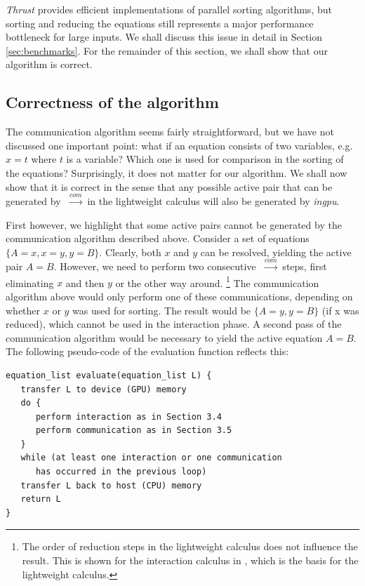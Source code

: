\documentclass[submission,copyright,creativecommons]{eptcs}
\newcommand{\lwcom}{$\;\stackrel{com}{\longrightarrow}\;$}
\begin{document}
\emph{Thrust} provides efficient implementations of parallel sorting algorithms,
but sorting and reducing the equations still represents a major performance
bottleneck for large inputs. We shall discuss this issue in
detail in Section \ref{sec:benchmarks}. For the remainder of this section, we
shall show that our algorithm is correct.

\subsection{Correctness of the algorithm}
\label{sec:correctness}
The communication algorithm seems fairly straightforward, but we have not
discussed one important point: what if an equation consists of two variables,
e.g. $x=t$ where $t$ is a variable? Which one is used for comparison in the
sorting of the equations? Surprisingly, it does not matter for our algorithm.
We shall now show that it is correct in the sense that any possible active pair
that can be generated by \lwcom in the lightweight calculus will also be
generated by \emph{ingpu}.

First however, we highlight that some active pairs cannot be generated by
the communication algorithm described above. Consider a set of equations
$\{A=x,x=y,y=B\}$. Clearly, both $x$ and $y$ can be resolved, yielding the
active pair $A=B$. However, we need to perform two consecutive \lwcom steps,
first eliminating $x$ and then $y$ or the other way around.%
\footnote{The order of reduction steps in the lightweight calculus does not
influence the result. This is shown for the interaction calculus in
\cite{DBLP:conf/ppdp/FernandezM99}, which is the basis for the lightweight
calculus.}
The communication algorithm above would only perform one of these
communications, depending on whether $x$ or $y$ was used for sorting. The result
would be $\{A=y,y=B\}$ (if x was reduced), which cannot be used in the
interaction phase. A second pass of the communication algorithm would be
necessary to yield the active equation $A = B$. The following pseudo-code of the
evaluation function reflects this:
\begin{lstlisting}
equation_list evaluate(equation_list L) {
   transfer L to device (GPU) memory
   do {
      perform interaction as in Section 3.4
      perform communication as in Section 3.5
   }
   while (at least one interaction or one communication
      has occurred in the previous loop)
   transfer L back to host (CPU) memory
   return L
}
\end{lstlisting}
\end{document}
